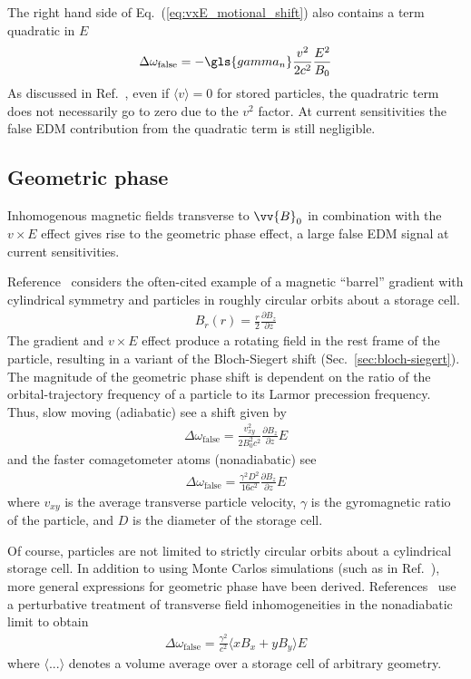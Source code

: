 The right hand side of Eq.~(\ref{eq:vxE_motional_shift}) also contains a term quadratic in $E$
%
\begin{gather}
    \Delta\omega_\text{false} = -\gls{gamma_n} \frac{v^2}{2c^2}\frac{E^2}{B_0} 
\end{gather}
%
As discussed in Ref.~\cite{lamoreaux_experimental_2009}, even if $\langle v \rangle=0$ for stored particles, the quadratric term does not necessarily go to zero due to the $v^2$ factor. At current sensitivities the false EDM contribution from the quadratic term is still negligible.

\subsection*{Geometric phase}

Inhomogenous magnetic fields transverse to $\vv{B}_0$ in combination with the $v\times E$ effect gives rise to the geometric phase effect, a large false EDM signal at current sensitivities. 

Reference~\cite{pendlebury_geometric-phase-induced_2004} considers the often-cited example of a  magnetic ``barrel'' gradient with cylindrical symmetry and particles in roughly circular orbits about a storage cell.
%
\begin{gather}
    B_r(r)=\frac{r}{2}\frac{\partial B_z}{\partial z}
\end{gather}
%
The gradient and $v\times E$ effect produce a rotating field in the rest frame of the particle, resulting in a variant of the Bloch-Siegert shift (Sec.~\ref{sec:bloch-siegert}). The magnitude of the geometric phase shift is dependent on the ratio of the orbital-trajectory frequency of a particle to its Larmor precession frequency. Thus, slow moving \ucn (adiabatic) see a shift given by~\cite{pendlebury_geometric-phase-induced_2004, afach_measurement_2015}
%
\begin{gather}
    \Delta\omega_\text{false} = \frac{v^2_{xy}}{2 B_0^2 c^2}\frac{\partial B_z}{\partial z}E
\end{gather}
%
and the faster \hg comagetometer atoms (nonadiabatic) see
%
\begin{gather}
    \Delta\omega_\text{false} = \frac{\gamma^2 D^2}{16  c^2}\frac{\partial B_z}{\partial z}E
\end{gather}
%
where $v_{xy}$ is the average transverse particle velocity, $\gamma$ is the gyromagnetic ratio of the particle, and $D$ is the diameter of the storage cell. 

Of course, particles are not limited to strictly circular orbits about a cylindrical storage cell. In addition to using Monte Carlos simulations (such as in Ref.~\cite{pignol_magic_2019}), more general expressions for geometric phase have been derived. References~\cite{pignol_geometric_phase_2012, pignol_geometric_phase_2015} use a perturbative treatment of transverse field inhomogeneities in the nonadiabatic limit to obtain
%
\begin{gather}
    \Delta\omega_\text{false} = \frac{\gamma^2}{c^2}\langle xB_x + yB_y \rangle E
\end{gather}
%
where $\langle ... \rangle$ denotes a volume average over a storage cell of arbitrary geometry.

